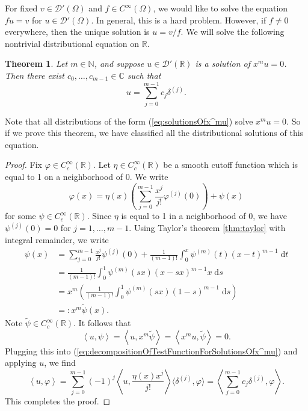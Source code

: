 \documentclass{book}
\newcommand{\scrD}{\mathscr{D}}
\newcommand{\bbC}{\mathbb{C}}
\newcommand{\bbN}{\mathbb{N}}
\newcommand{\bbR}{\mathbb{R}}
\renewcommand{\d}{\mathrm{d}}
\renewcommand{\phi}{\varphi}
\newcommand{\angles}[1]{\left\langle {#1} \right\rangle}
\newcommand{\fhangles}[1]{\langle {#1} \rangle}
\newcommand{\parens}[1]{\left( {#1} \right)}
\newtheorem{theorem}{Theorem}[chapter]
\theoremstyle{definition}
\theoremstyle{remark}
\numberwithin{equation}{chapter}
\begin{document}
For fixed $v \in \scrD'(\Omega)$ and $f \in C^\infty(\Omega)$, we would like to solve the equation $fu = v$ for $u \in \scrD'(\Omega)$. In general, this is a hard problem. However, if $f \neq 0$ everywhere, then the unique solution is $u = v/f$. We will solve the following nontrivial distributional equation on $\bbR$.
\begin{theorem} \label{thm:solutionsOfxmu}
    Let $m \in \bbN$, and suppose $u \in \scrD'(\bbR)$ is a solution of $x^m u = 0$. Then there exist $c_0,\dots,c_{m-1} \in \bbC$ such that 
    \begin{equation} \label{eq:solutionsOfx^mu}
        u = \sum_{j=0}^{m-1} c_j \delta^{(j)}.
    \end{equation}
\end{theorem}
Note that all distributions of the form (\ref{eq:solutionsOfx^mu}) solve $x^m u = 0$. So if we prove this theorem, we have classified all the distributional solutions of this equation.
\begin{proof}
    Fix $\phi \in C_c^\infty(\bbR)$. Let $\eta \in C_c^\infty(\bbR)$ be a smooth cutoff function which is equal to 1 on a neighborhood of $0$. We write 
    \begin{equation} \label{eq:decompositionOfTestFunctionForSolutionsOfx^mu}
        \phi(x) = \eta(x)\parens{ \sum_{j=0}^{m-1} \frac{x^j}{j!}\phi^{(j)}(0) } + \psi(x)
    \end{equation}
    for some $\psi \in C_c^\infty(\bbR)$. Since $\eta$ is equal to 1 in a neighborhood of $0$, we have $\psi^{(j)}(0) = 0$ for $j = 1,\dots,m-1$. Using Taylor's theorem \ref{thm:taylor} with integral remainder, we write 
    \begin{equation} \begin{aligned}
        \psi(x) &= \sum_{j=0}^{m-1} \frac{x^j}{j!} \psi^{(j)}(0) + \frac{1}{(m-1)!}\int_0^x \psi^{(m)}(t)(x-t)^{m-1} \; \d t \\
                &= \frac{1}{(m-1)!}\int_0^1 \psi^{(m)}(sx)(x-sx)^{m-1}x \; \d s \\
                &= x^m \parens{ \frac{1}{(m-1)!}\int_0^1 \psi^{(m)}(sx)(1-s)^{m-1} \; \d s } \\
                &=: x^m \widetilde{\psi}(x).
    \end{aligned} \end{equation}
    Note $\widetilde{\psi} \in C_c^\infty(\bbR)$. It follows that
    \begin{equation}
        \angles{ u,\psi } = \angles{ u,x^m\widetilde{\psi} } = \angles{ x^m u,\widetilde{\psi} } = 0.
    \end{equation}
    Plugging this into (\ref{eq:decompositionOfTestFunctionForSolutionsOfx^mu}) and applying $u$, we find 
    \begin{equation}
        \angles{ u,\phi } = \sum_{j=0}^{m-1} (-1)^j\angles{ u,\frac{\eta(x)x^j}{j!} } \fhangles{ \delta^{(j)},\phi }
        = \angles{ \sum_{j=0}^{m-1} c_j \delta^{(j)}, \phi }.
    \end{equation}
    This completes the proof.
\end{proof}
\end{document}
